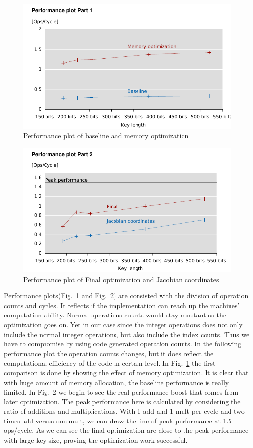 \begin{figure}[h!]\centering
  \includegraphics[scale=0.7]{perfplot1}
  \caption{Performance plot of baseline and memory optimization\label{perfplot1}}
\end{figure}
\begin{figure}[h!]\centering
  \includegraphics[scale=0.7]{perfplot2}
  \caption{Performance plot of Final optimization and Jacobian coordinates\label{perfplot2}}
\end{figure}

Performance plots(Fig.~\ref{perfplot1} and Fig.~\ref{perfplot2}) are consisted with the division of operation counts and cycles. It reflects if the implementation can reach up the machines' computation ability. Normal operations counts would stay constant as the optimization goes on. Yet in our case since the integer operations does not only include the normal integer operations, but also include the index counts. Thus we have to compromise by using code generated operation counts. In the following performance plot the operation counts changes, but it does reflect the computational efficiency of the code in certain level. In Fig.~\ref{perfplot1} the first comparison is done by showing the effect of memory optimization. It is clear that with huge amount of memory allocation, the baseline performance is really limited. In Fig.~\ref{perfplot2} we begin to see the real performance boost that comes from later optimization. The peak performance here is calculated by considering the ratio of additions and multiplications. With 1 add and 1 mult per cycle and two times add versus one mult, we can draw the line of peak performance at 1.5 ops/cycle. As we can see the final optimization are close to the peak performance with large key size, proving the optimization work successful.


